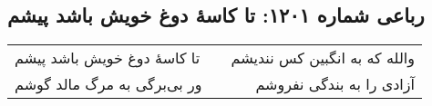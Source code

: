 \begin{center}
\section*{رباعی شماره ۱۲۰۱: تا کاسهٔ دوغ خویش باشد پیشم}
\label{sec:1201}
\begin{longtable}{l p{0.5cm} r}
تا کاسهٔ دوغ خویش باشد پیشم
&&
والله که به انگبین کس نندیشم
\\
ور بی‌برگی به مرگ مالد گوشم
&&
آزادی را به بندگی نفروشم
\\
\end{longtable}
\end{center}
